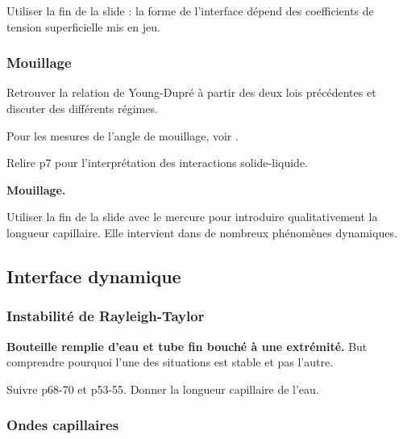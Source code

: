 \begin{transition}
Utiliser la fin de la slide : la forme de l'interface dépend des coefficients de tension superficielle mis en jeu.
\end{transition}

\subsubsection{Mouillage}

Retrouver la relation de Young-Dupré à partir des deux lois précédentes \cite{Sanz2016} et discuter des différents régimes.

\begin{remarque}
Pour les mesures de l'angle de mouillage, voir \cite{Guyon2001}.

\noindent
Relire \cite{Marchand2011} p7 pour l'interprétation des interactions solide-liquide.
\end{remarque}

\begin{slide}
\textbf{Mouillage.}
\end{slide}

\begin{transition}
Utiliser la fin de la slide avec le mercure pour introduire qualitativement la longueur capillaire.
Elle intervient dans de nombreux phénomènes dynamiques.
\end{transition}

\subsection{Interface dynamique}

\subsubsection{Instabilité de Rayleigh-Taylor}

\begin{experience}
\textbf{Bouteille remplie d'eau et tube fin bouché à une extrémité.}
But comprendre pourquoi l'une des situations est stable et pas l'autre.
\end{experience}
Suivre \cite{Guyon2001} p68-70 et \cite{Charru2007} p53-55.
Donner la longueur capillaire de l'eau.

\subsubsection{Ondes capillaires}

